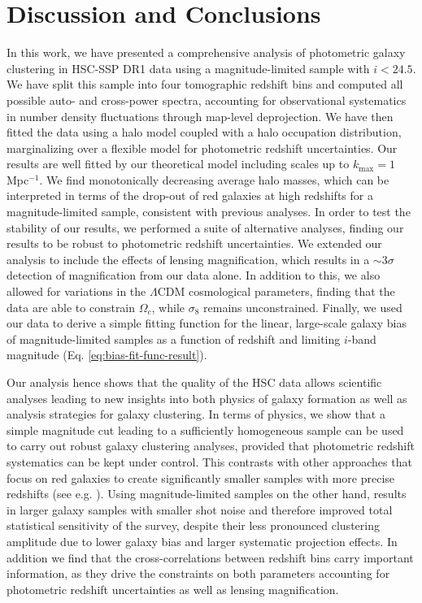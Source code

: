 \documentclass[a4paper,11pt]{article}
\begin{document}
\section{Discussion and Conclusions}\label{sec:discussion}
  In this work, we have presented a comprehensive analysis of photometric galaxy clustering in HSC-SSP DR1 data using a magnitude-limited sample with $i<24.5$. We have split this sample into four tomographic redshift bins and computed all possible auto- and cross-power spectra, accounting for observational systematics in number density fluctuations through map-level deprojection. We have then fitted the data using a halo model coupled with a halo occupation distribution, marginalizing over a flexible model for photometric redshift uncertainties. Our results are well fitted by our theoretical model including scales up to $k_{\mathrm{max}} = 1$ Mpc$^{-1}$. We find monotonically decreasing average halo masses, which can be interpreted in terms of the drop-out of red galaxies at high redshifts for a magnitude-limited sample, consistent with previous analyses. In order to test the stability of our results, we performed a suite of alternative analyses, finding our results to be robust to photometric redshift uncertainties. We extended our analysis to include the effects of lensing magnification, which results in a $\sim 3 \sigma$ detection of magnification from our data alone. In addition to this, we also allowed for variations in the $\Lambda$CDM cosmological parameters, finding that the data are able to constrain $\Omega_{c}$, while $\sigma_{8}$ remains unconstrained. Finally, we used our data to derive a simple fitting function for the linear, large-scale galaxy bias of magnitude-limited samples as a function of redshift and limiting $i$-band magnitude (Eq. \ref{eq:bias-fit-func-result}).

  Our analysis hence shows that the quality of the HSC data allows scientific analyses leading to new insights into both physics of galaxy formation as well as analysis strategies for galaxy clustering. In terms of physics, we show that a simple magnitude cut leading to a sufficiently homogeneous sample can be used to carry out robust galaxy clustering analyses, provided that photometric redshift systematics can be kept under control. This contrasts with other approaches that focus on red galaxies to create significantly smaller samples with more precise redshifts (see e.g. \cite{1507.05460,1807.10163}). Using magnitude-limited samples on the other hand, results in larger galaxy samples with smaller shot noise and therefore improved total statistical sensitivity of the survey, despite their less pronounced clustering amplitude due to lower galaxy bias and larger systematic projection effects. In addition we find that the cross-correlations between redshift bins carry important information, as they drive the constraints on both parameters accounting for photometric redshift uncertainties as well as lensing magnification.
\end{document}
